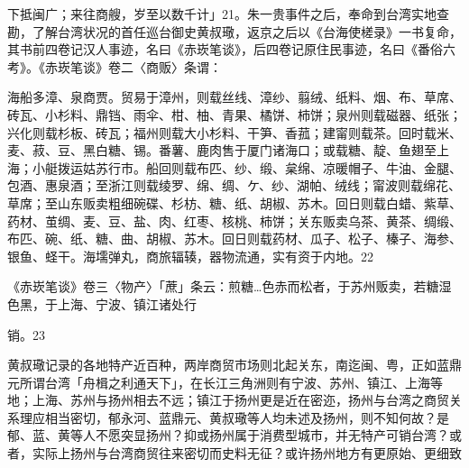 \vfill
\begin{BookNotes}
\end{BookNotes}

\noindent 下抵闽广；来往商艘，岁至以数千计」21。朱一贵事件之后，奉命到台湾实地查勘，了解台湾状况的首任巡台御史黄叔璥，返京之后以《台海使槎录》一书复命，其书前四卷记汉人事迹，名曰《赤崁笔谈》，后四卷记原住民事迹，名曰《番俗六考》。《赤崁笔谈》卷二〈商贩〉条谓：

\begin{BookQuote}
海船多漳、泉商贾。贸易于漳州，则载丝线、漳纱、翦绒、纸料、烟、布、草席、砖瓦、小杉料、鼎铛、雨伞、柑、柚、青果、橘饼、柿饼；泉州则载磁器、纸张；兴化则载杉板、砖瓦；福州则载大小杉料、干笋、香菰；建甯则载茶。回时载米、麦、菽、豆、黑白糖、锡。番薯、鹿肉售于厦门诸海口；或载糖、靛、鱼翅至上海；小艇拨运姑苏行市。船回则载布匹、纱、缎、枲绵、凉暖帽子、牛油、金腿、包酒、惠泉酒；至浙江则载绫罗、绵、绸、ケ、纱、湖帕、绒线；甯波则载绵花、草席；至山东贩卖粗细碗碟、杉枋、糖、纸、胡椒、苏木。回日则载白蜡、紫草、药材、茧绸、麦、豆、盐、肉、红枣、核桃、柿饼；关东贩卖乌茶、黄茶、绸缎、布匹、碗、纸、糖、曲、胡椒、苏木。回日则载药材、瓜子、松子、榛子、海参、银鱼、蛏干。海壖弹丸，商旅辐辏，器物流通，实有资于内地。22
\end{BookQuote}

\begin{BookQuote}
《赤崁笔谈》卷三〈物产〉「蔗」条云：煎糖…色赤而松者，于苏州贩卖，若糖湿色黑，于上海、宁波、镇江诸处行
\end{BookQuote}

销。23

黄叔璥记录的各地特产近百种，两岸商贸市场则北起关东，南迄闽、粤，正如蓝鼎元所谓台湾「舟楫之利通天下」，在长江三角洲则有宁波、苏州、镇江、上海等地；上海、苏州与扬州相去不远；镇江于扬州更是近在密迩，扬州与台湾之商贸关系理应相当密切，郁永河、蓝鼎元、黄叔璥等人均未述及扬州，则不知何故？是郁、蓝、黄等人不愿突显扬州？抑或扬州属于消费型城市，并无特产可销台湾？或者，实际上扬州与台湾商贸往来密切而史料无征？或许扬州地方有更原始、更细致

